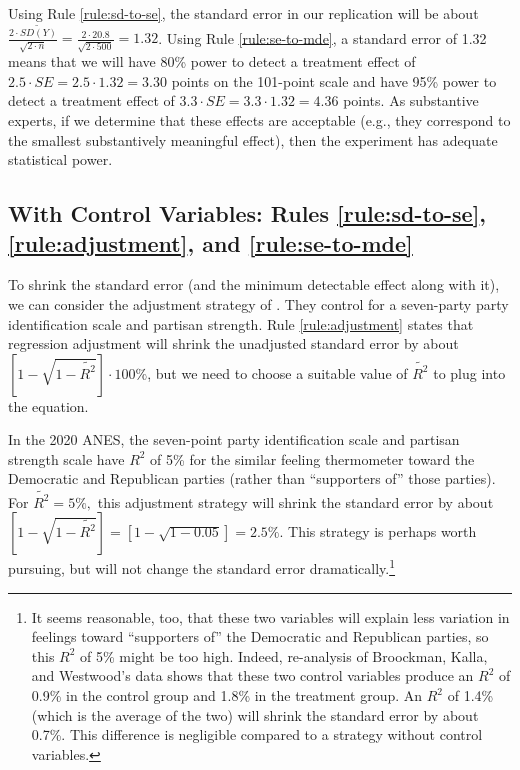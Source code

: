 \documentclass[12pt]{article}
\begin{document}
Using Rule \ref{rule:sd-to-se}, the standard error in our replication will be about $\frac{2 \cdot \widetilde{SD(Y)}}{\sqrt{2 \cdot n}} = \frac{2 \cdot 20.8}{\sqrt{2 \cdot 500}} = 1.32$.
Using Rule \ref{rule:se-to-mde}, a standard error of 1.32 means that we will have 80\% power to detect a treatment effect of $2.5 \cdot SE = 2.5 \cdot 1.32 = 3.30$ points on the 101-point scale and have 95\% power to detect a treatment effect of $3.3 \cdot SE = 3.3 \cdot 1.32 = 4.36$ points. 
As substantive experts, if we determine that these effects are acceptable (e.g., they correspond to the smallest substantively meaningful effect), then the experiment has adequate statistical power.


\subsection*{With Control Variables: Rules \ref{rule:sd-to-se}, \ref{rule:adjustment}, and \ref{rule:se-to-mde}}

To shrink the standard error (and the minimum detectable effect along with it), we can consider the adjustment strategy of \cite{Broockman2022}. 
They control for a seven-party party identification scale and partisan strength. 
Rule \ref{rule:adjustment} states that regression adjustment will shrink the unadjusted standard error by about $\left\lbrack 1 - \sqrt{ 1 - \widetilde{R^{2}} } \right\rbrack \cdot 100\%$, but we need to choose a suitable value of $\widetilde{R^{2}}$ to plug into the equation.

In the 2020 ANES, the seven-point party identification scale and partisan strength scale have $R^{2}$ of 5\% for the similar feeling thermometer toward the Democratic and Republican parties (rather than ``supporters of'' those parties). 
For $\widetilde{R^{2}} = 5\%,$ this adjustment strategy will shrink the standard error by about $\left\lbrack 1 - \sqrt{ 1 - \widetilde{R^{2}} } \right\rbrack = \left\lbrack 1 - \sqrt{1 - 0.05} \right\rbrack = 2.5\%$.
This strategy is perhaps worth pursuing, but will not change the standard error dramatically.\footnote{It seems reasonable, too, that these two variables will explain less variation in feelings toward ``supporters of'' the Democratic and Republican parties, so this $R^{2}$ of 5\% might be too high. Indeed, re-analysis of Broockman, Kalla, and Westwood's data shows that these two control variables produce an $R^{2}$ of 0.9\% in the control group and 1.8\% in the treatment group. An $R^{2}$ of 1.4\% (which is the average of the two) will shrink the standard error by about 0.7\%. This difference is negligible compared to a strategy without control variables.}
\end{document}
